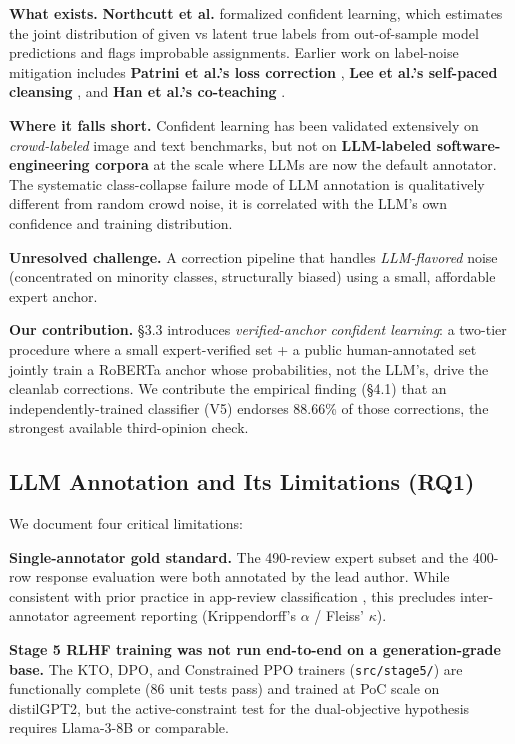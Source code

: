 \documentclass[sigconf, nonacm, anonymous, balance=false]{acmart}
\begin{document}
\textbf{What exists.} \textbf{Northcutt et al.} \cite{northcutt2021cleanlab} formalized confident learning, which estimates the joint distribution of given vs latent true labels from out-of-sample model predictions and flags improbable assignments. Earlier work on label-noise mitigation includes \textbf{Patrini et al.'s loss correction} \cite{patrini2017making}, \textbf{Lee et al.'s self-paced cleansing} \cite{lee2018cleannet}, and \textbf{Han et al.'s co-teaching} \cite{han2018coteaching}.

\textbf{Where it falls short.} Confident learning has been validated extensively on \emph{crowd-labeled} image and text benchmarks, but not on \textbf{LLM-labeled software-engineering corpora} at the scale where LLMs are now the default annotator. The systematic class-collapse failure mode of LLM annotation is qualitatively different from random crowd noise, it is correlated with the LLM's own confidence and training distribution.

\textbf{Unresolved challenge.} A correction pipeline that handles \emph{LLM-flavored} noise (concentrated on minority classes, structurally biased) using a small, affordable expert anchor.

\textbf{Our contribution.} \S3.3 introduces \emph{verified-anchor confident learning}: a two-tier procedure where a small expert-verified set + a public human-annotated set jointly train a RoBERTa anchor whose probabilities, not the LLM's, drive the cleanlab corrections. We contribute the empirical finding (\S4.1) that an independently-trained classifier (V5) endorses 88.66\% of those corrections, the strongest available third-opinion check.

\subsection{LLM Annotation and Its Limitations (RQ1)}\label{llm-annotation-and-its-limitations-gap-g1-characterization}

We document four critical limitations:

\textbf{Single-annotator gold standard.} The 490-review expert subset and the 400-row response evaluation were both annotated by the lead author. While consistent with prior practice in app-review classification \cite{maalej2016, chen2014arminer, villarroel2016}, this precludes inter-annotator agreement reporting (Krippendorff's $\alpha$ / Fleiss' $\kappa$).

\textbf{Stage 5 RLHF training was not run end-to-end on a generation-grade base.} The KTO, DPO, and Constrained PPO trainers (\texttt{src/stage5/}) are functionally complete (86 unit tests pass) and trained at PoC scale on distilGPT2, but the active-constraint test for the dual-objective hypothesis requires Llama-3-8B or comparable.
\end{document}
